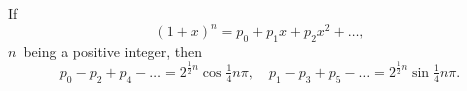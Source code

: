 If
\[
(1 + x)^{n} = p_{0} + p_{1}x + p_{2}x^{2} + \dots,
\]
$n$~being a positive integer, then
\[
p_{0} - p_{2} + p_{4} - \dots = 2^{\frac{1}{2} n} \cos\tfrac{1}{4}n\pi,\quad
p_{1} - p_{3} + p_{5} - \dots = 2^{\frac{1}{2} n} \sin\tfrac{1}{4}n\pi.
\]

